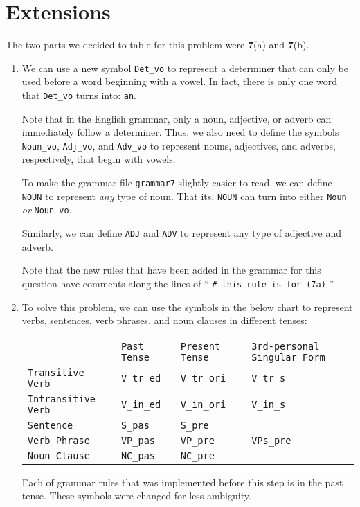 \documentclass[11pt]{article}
\newcommand{\code}[1]{\texttt{#1}}
\begin{document}
\section{Extensions}
The two parts we decided to table for this problem were \textbf{7}(a) and \textbf{7}(b).
\begin{enumerate}
\item
	We can use a new symbol \code{Det\_vo} to represent a determiner that can only be used before a word beginning with a vowel. In fact, there is only one word that \code{Det\_vo} turns into: \code{an}.
	
Note that in the English grammar, only a noun, adjective, or adverb can immediately follow a determiner.
Thus, we also need to define the symbols \code{Noun\_vo}, \code{Adj\_vo}, and \code{Adv\_vo} to represent nouns, adjectives, and adverbs, respectively, that begin with vowels.

To make the grammar file \code{grammar7} slightly easier to read, we can define \code{NOUN} to represent \textit{any} type of noun. That its, \code{NOUN} can turn into either \code{Noun} \textit{or} \code{Noun\_vo}.

Similarly, we can define \code{ADJ} and \code{ADV} to represent any type of adjective and adverb. 

Note that the new rules that have been added in the grammar for this question have comments along the lines of `` \code{\# this rule is for (7a)} ''.
\item
	To solve this problem, we can use the symbols in the below chart to represent verbs, sentences, verb phrases, and noun clauses in different tenses:
\begin{center} \begin{tabular}{l l l l}
    &                              \code{Past Tense} & \code{Present Tense} & \code{3rd-personal Singular Form}  \\
\code{Transitive Verb}   & \code{V\_tr\_ed} & \code{V\_tr\_ori}  & \code{V\_tr\_s} \\
\code{Intransitive Verb} & \code{V\_in\_ed} & \code{V\_in\_ori} & \code{V\_in\_s} \\
\code{Sentence}            & \code{S\_pas}     & \code{S\_pre}      &     \\
\code{Verb Phrase}       & \code{VP\_pas}   & \code{VP\_pre}   & \code{VPs\_pre} \\
\code{Noun Clause}      & \code{NC\_pas}   & \code{NC\_pre}  &                            \\
\end{tabular}\end{center}
	Each of grammar rules that was implemented before this step is in the past tense. These symbols were changed for less ambiguity.
	

\end{enumerate}
\end{document}
